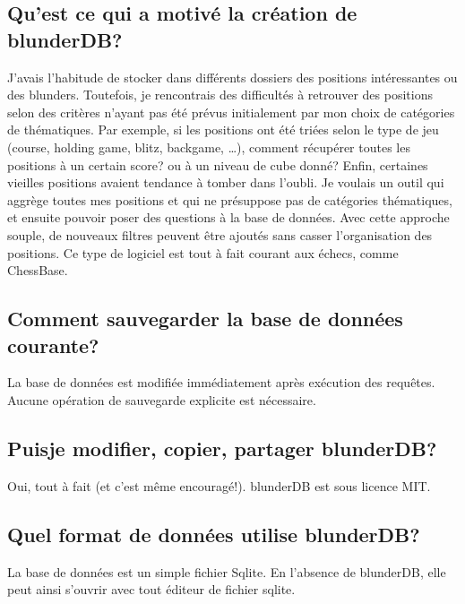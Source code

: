\documentclass[letterpaper,10pt,french]{sphinxmanual}
\begin{document}
\subsection{Qu’est ce qui a motivé la création de blunderDB?}
\label{\detokenize{faq:qu-est-ce-qui-a-motive-la-creation-de-blunderdb}}
\sphinxAtStartPar
J’avais l’habitude de stocker dans différents dossiers des positions
intéressantes ou des blunders. Toutefois, je rencontrais des difficultés à
retrouver des positions selon des critères n’ayant pas été prévus initialement
par mon choix de catégories de thématiques. Par exemple, si les positions ont
été triées selon le type de jeu (course, holding game, blitz, backgame, …),
comment récupérer toutes les positions à un certain score? ou à un niveau de
cube donné? Enfin, certaines vieilles positions avaient tendance à tomber dans
l’oubli. Je voulais un outil qui aggrège toutes mes positions et qui ne
présuppose pas  de catégories thématiques, et ensuite pouvoir poser
des questions à la base de données. Avec cette approche souple, de nouveaux
filtres peuvent être ajoutés sans casser l’organisation des positions. Ce type
de logiciel est tout à fait courant aux échecs, comme ChessBase.


\subsection{Comment sauvegarder la base de données courante?}
\label{\detokenize{faq:comment-sauvegarder-la-base-de-donnees-courante}}
\sphinxAtStartPar
La base de données est modifiée immédiatement après exécution des requêtes.
Aucune opération de sauvegarde explicite est nécessaire.


\subsection{Puis\sphinxhyphen{}je modifier, copier, partager blunderDB?}
\label{\detokenize{faq:puis-je-modifier-copier-partager-blunderdb}}
\sphinxAtStartPar
Oui, tout à fait (et c’est même encouragé!). blunderDB est sous licence MIT.


\subsection{Quel format de données utilise blunderDB?}
\label{\detokenize{faq:quel-format-de-donnees-utilise-blunderdb}}
\sphinxAtStartPar
La base de données est un simple fichier Sqlite. En l’absence de
blunderDB, elle peut ainsi s’ouvrir avec tout éditeur de fichier sqlite.
\end{document}
